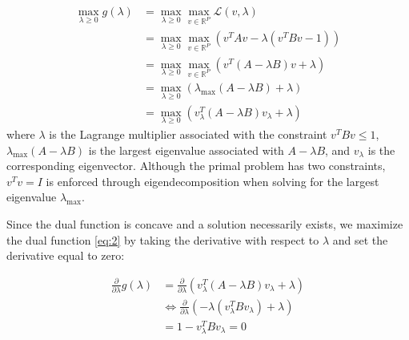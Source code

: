 \documentclass[12pt]{article}
\begin{document}
\begin{align}
    \max_{\lambda \geq 0}{g(\lambda)} &= \max_{\lambda \geq 0}{\max_{v\in \mathbb{R}^{P}}{\mathcal{L}}}\left(v,\lambda\right) \nonumber\\
                                        &= \max_{\lambda \geq 0}{\max_{v\in \mathbb{R}^{P}}{\left( v^TAv - \lambda\left(v^TBv - 1\right)\right)}} \nonumber\\
                                        &= \max_{\lambda \geq 0}{\max_{v\in \mathbb{R}^{P}}{\left(v^T\left(A - \lambda B\right)v + \lambda\right)}}\nonumber\\
                                        &= \max_{\lambda \geq 0}{\left(\lambda_{\text{max}}\left(A - \lambda B\right) + \lambda\right)} \nonumber\\
                                        &= \max_{\lambda \geq 0}{\left(v_{\lambda}^T\left(A - \lambda B\right) v_{\lambda}+ \lambda\right)} \label{eq:2}
\end{align}
where $\lambda$ is the Lagrange multiplier associated with the constraint $v^T Bv \leq 1$, $\lambda_{\max}(A - \lambda B)$ is the largest eigenvalue associated with $A - \lambda B$, and $v_{\lambda}$ is the corresponding eigenvector. Although the primal problem has two constraints, $v^T v = I$ is enforced through eigendecomposition when solving for the largest eigenvalue $\lambda_{\text{max}}$. %

Since the dual function is concave and a solution necessarily exists, we maximize the dual function \eqref{eq:2} by taking the derivative with respect to $\lambda$ and set the derivative equal to zero: 

\begin{align}
    \frac{\partial}{\partial\lambda} g(\lambda) &= \frac{\partial}{\partial\lambda} \left(v_{\lambda}^T\left(A - \lambda B\right) v_{\lambda}+ \lambda\right)\nonumber \\ 
                                                &\Leftrightarrow \frac{\partial}{\partial\lambda}\left( -\lambda \left(v_{\lambda}^{T} Bv_{\lambda}\right) + \lambda \right) \nonumber\\
                                                &= 1-v_\lambda^{T}B v_{\lambda} = 0 \label{eq:3}
\end{align}
\end{document}
